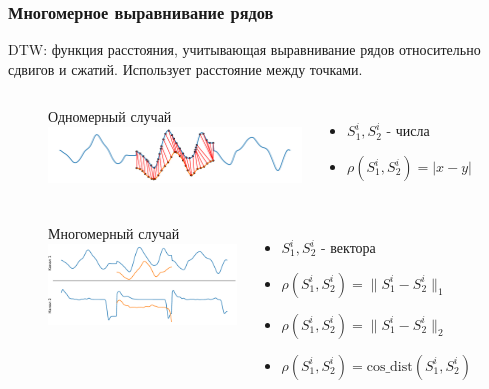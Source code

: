 \documentclass{beamer}
\begin{document}
\begin{frame}
\frametitle{Многомерное выравнивание рядов}
    \begin{block}{}
        DTW: функция расстояния, учитывающая выравнивание рядов относительно сдвигов и сжатий. Использует расстояние между точками. 
    \end{block}    
    \begin{figure}
        \begin{columns}

               \centering
               Одномерный случай
               \includegraphics[width=\linewidth]{img1.pdf}
            \begin{itemize}
                \item  $S_1^i, S_2^i$ \-- числа
                \item  $\rho(S_1^i, S_2^i) = | x - y |$
            \end{itemize}
        \end{columns} 
        \begin{columns}
                \centering
               Многомерный случай
               \includegraphics[width=\linewidth]{img2.pdf}
            \begin{itemize}
                \item  $S_1^i, S_2^i $ \-- вектора
                \item  $\rho(S_1^i, S_2^i) = \|S_1^i - S_2^i\|_1$
                \item  $\rho(S_1^i, S_2^i) = \|S_1^i - S_2^i\|_2$
                \item  $\rho(S_1^i, S_2^i) = \text{cos\_dist}(S_1^i, S_2^i)$          
            \end{itemize}

        \end{columns} 
    \end{figure}
\end{frame}    
\end{document}
